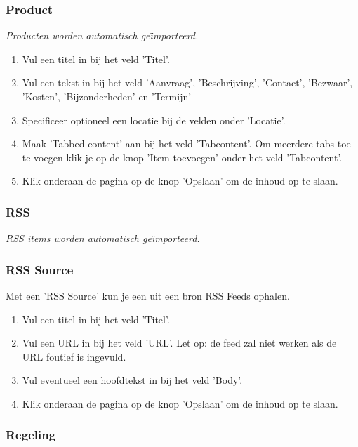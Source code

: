 \subsubsection{Product}\label{product}

\emph{Producten worden automatisch ge{\"\i}mporteerd.}

\begin{enumerate}
\item Vul een titel in bij het veld 'Titel'.
\item Vul een tekst in bij het veld 'Aanvraag', 'Beschrijving', 'Contact', 'Bezwaar', 'Kosten', 'Bijzonderheden' en 'Termijn'
\item Specificeer optioneel een locatie bij de velden onder 'Locatie'.
\item Maak 'Tabbed content' aan bij het veld 'Tabcontent'. Om meerdere tabs toe te voegen klik je op de knop 'Item toevoegen' onder het veld 'Tabcontent'.
\item Klik onderaan de pagina op de knop 'Opslaan' om de inhoud op te slaan.
\end{enumerate}

\subsubsection{RSS}\label{rss}

\emph{RSS items worden automatisch ge{\"\i}mporteerd.}

\subsubsection{RSS Source}\label{rsssource}
Met een 'RSS Source' kun je een uit een bron RSS Feeds ophalen.

\begin{enumerate}
\item Vul een titel in bij het veld 'Titel'.
\item Vul een URL in bij het veld 'URL'. Let op: de feed zal niet werken als de URL foutief is ingevuld.
\item Vul eventueel een hoofdtekst in bij het veld 'Body'.
\item Klik onderaan de pagina op de knop 'Opslaan' om de inhoud op te slaan.
\end{enumerate}

\subsubsection{Regeling}\label{regeling}

